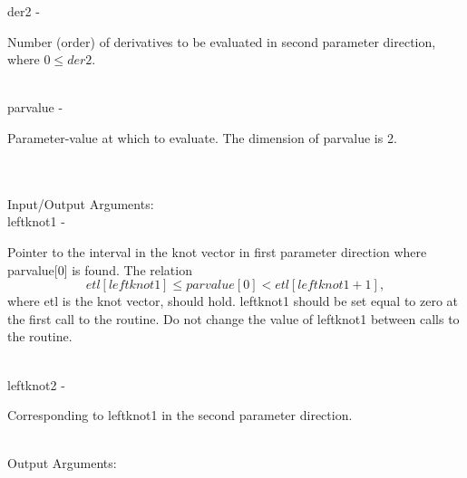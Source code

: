         \>\>    {\fov der2}\> - \>              \begin{minipg2}
                                Number (order) of derivatives to be
                                evaluated in
                                second parameter direction, where $0\leq
                                der2$.
                                \end{minipg2}\\[0.8ex]
        \>\>    {\fov parvalue}\> - \>          \begin{minipg2}
                                Parameter-value at which to evaluate. The dimension
                                of {\fov parvalue} is 2.
                                \end{minipg2}\\[0.8ex]
\\
        \>Input/Output Arguments:\\
        \>\>    {\fov leftknot1}\> - \> \begin{minipg2}
                                Pointer to the interval in the knot vector in first
                                parameter direction where {\fov parvalue}[0] is
                                found. The relation
                                \[
                                etl[leftknot1]\leq parvalue[0]<etl[leftknot1+1],
                                \]
                                where {\fov etl} is the knot vector, should
                                hold. {\fov leftknot1}  should be set
                                equal to zero at the first call to the
                                routine.
                                Do not change the value of {\fov leftknot1}
                                between calls to the routine.
                                \end{minipg2}\\[0.8ex]
        \>\>    {\fov leftknot2}\> - \> \begin{minipg2}
                                Corresponding to {\fov leftknot1} in the
                                second parameter direction.
                                \end{minipg2}\\[0.8ex]
\newpagetabs
        \>Output Arguments:\\
